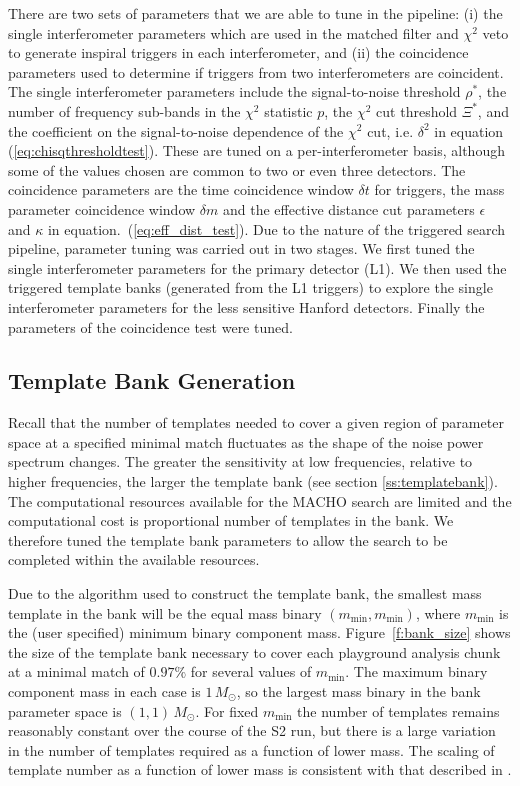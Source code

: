 There are two sets of parameters that we are able to tune in the pipeline: (i)
the single interferometer parameters which are used in the matched filter and
$\chi^2$ veto to generate inspiral triggers in each interferometer, and (ii)
the coincidence parameters used to determine if triggers from two
interferometers are coincident. The single interferometer parameters include
the signal-to-noise threshold $\rho^\ast$, the number of frequency sub-bands in
the $\chi^2$ statistic $p$, the $\chi^2$ cut threshold $\Xi^\ast$,  and the
coefficient on the signal-to-noise dependence of the $\chi^2$ cut, i.e.
$\delta^2$ in equation (\ref{eq:chisqthresholdtest}). These are tuned on a
per-interferometer basis, although some of the values chosen are common to two
or even three detectors.  The coincidence parameters are the time coincidence
window $\delta t$ for triggers, the mass parameter coincidence window $\delta
m$ and the effective distance cut parameters $\epsilon$ and $\kappa$ in
equation.~(\ref{eq:eff_dist_test}).  Due to the nature of the triggered search
pipeline, parameter tuning was carried out in two stages. We first tuned the
single interferometer parameters for the primary detector (L1).  We then used
the triggered template banks (generated from the L1 triggers) to explore the
single interferometer parameters for the less sensitive Hanford detectors.
Finally the parameters of the coincidence test were tuned.

\subsection{Template Bank Generation}
\label{ss:tunebank}

Recall that the number of templates needed to cover a given region of
parameter space at a specified minimal match fluctuates as the shape of the
noise power spectrum changes. The greater the sensitivity at low frequencies,
relative to higher frequencies, the larger the template bank (see section
\ref{ss:templatebank}). The computational resources available for the MACHO
search are limited and the computational cost is proportional number of
templates in the bank. We therefore tuned the template bank parameters to
allow the search to be completed within the available resources.

Due to the algorithm used to construct the template bank\cite{Owen:1998dk}, the
smallest mass template in the bank will be the equal mass binary
$(m_\mathrm{min},m_\mathrm{min})$, where $m_\mathrm{min}$ is the (user
specified) minimum binary component mass. Figure~\ref{f:bank_size} shows the
size of the template bank necessary to cover each playground analysis chunk at
a minimal match of $0.97\%$ for several values of $m_\mathrm{min}$.  The
maximum binary component mass in each case is $1\,M_\odot$, so the largest
mass binary in the bank parameter space is $(1,1)\,M_\odot$. For fixed
$m_\mathrm{min}$ the number of templates remains reasonably constant over the
course of the S2 run, but there is a large variation in the number of templates
required as a function of lower mass. The scaling of template number
as a function of lower mass is consistent with that described in
\cite{Owen:1998dk}.

